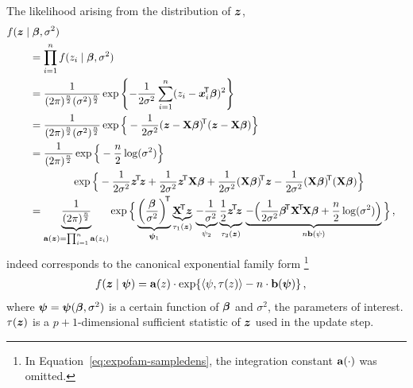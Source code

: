 The likelihood arising from the distribution of ${\bm z}$,
\begin{align*}
\lefteqn{f(\z \mid \bbeta, \sigma^2)}\hspace{5ex}\\
               &= \prod_{i=1}^n f(z_i \mid \bbeta, \sigma^2)\\
               &= \frac{1}{(2\pi)^{\frac{n}{2}} (\sigma^2)^{\frac{n}{2}}}
                  \exp\left\{ -\frac{1}{2 \sigma^2} \sum_{i=1}^n (z_i - \x_i^\tra\bbeta)^2  \right\}\\
               &= \frac{1}{(2\pi)^{\frac{n}{2}} (\sigma^2)^{\frac{n}{2}}}
                  \exp \Big\{ -\frac{1}{2 \sigma^2} (\z -\X\bbeta)^\tra (\z -\X\bbeta) \Big\}\\
               &= \frac{1}{(2\pi)^{\frac{n}{2}}}
                  \exp \Big\{ -\frac{n}{2}\log(\sigma^2) \Big\} \\ 
               & \hspace*{9.4ex}%
                  \exp \Big\{ -\frac{1}{2 \sigma^2} \ztz
                              +\frac{1}{2 \sigma^2} \z^\tra \X\bbeta
                              +\frac{1}{2 \sigma^2} (\X\bbeta)^\tra \z
                              -\frac{1}{2 \sigma^2} (\X\bbeta)^\tra (\X\bbeta) \Big\}\\
               &= \underbrace{ \frac{1}{(2\pi)^{\frac{n}{2}}} }_{ \mbf{a}(\bs{z}) = \prod_{i=1}^n \mbf{a}(z_i)}
                  \exp \Big\{ \underbrace{ \left(\frac{\bbeta}{\sigma^2}\right)^\tra}_{\bpsi_1}
                              \underbrace{ \X^\tra \z }_{ \tau_1(\z) } \,
                              \underbrace{-\frac{1}{\sigma^2}}_{\psi_2}
                              \underbrace{ \frac{1}{2} \ztz }_{\tau_2(\z)} \,
                              \underbrace{-\Big(\frac{1}{2 \sigma^2} \bbeta^\tra \XtX \bbeta
                                          +\frac{n}{2} \log(\sigma^2) \Big)}_{n \mbf{b}(\psi)} \Big\}\,,
\end{align*}
indeed corresponds to the canonical exponential family form%
\footnote{In Equation~\ref{eq:expofam-sampledens}, the integration constant $\mathbf{a}(\cdot)$
was omitted.}
\begin{align*}
f({\bm z}\mid\boldsymbol{\psi}) &= \mathbf{a}(z) \cdot \exp \{\langle \psi, \tau(z) \rangle - n \cdot \mathbf{b}(\boldsymbol{\psi})\}\,,
\end{align*}
where $\boldsymbol{\psi}=\boldsymbol{\psi}(\boldsymbol{\beta}, \sigma^2)$ is a certain function of $\boldsymbol{\beta}$ and $\sigma^2$,
the parameters of interest. $\tau({\bm z})$ is a $p+1$-dimensional sufficient statistic of ${\bm z}$ used in the update step. 
